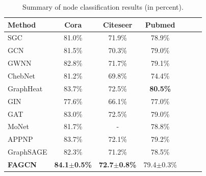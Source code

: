 \documentclass[letterpaper]{article} %
\begin{document}
\newsavebox{\tablebox}
\begin{table}
  \centering
  \caption{Summary of node classification results (in percent).}
	\begin{lrbox}{\tablebox}
    \begin{tabular}{lcccccc}
    \toprule
    \textbf{Method} & \textbf{Cora} & \textbf{Citeseer} & \textbf{Pubmed} \\
    \midrule
	SGC & 81.0\% & 71.9\% & 78.9\% \\
    GCN & 81.5\% & 70.3\% & 79.0\% \\
    GWNN & 82.8\% & 71.7\% & 79.1\%\\
    ChebNet & 81.2\% & 69.8\% & 74.4\%\\
    GraphHeat & 83.7\% & 72.5\% & \textbf{80.5\%}\\
	\midrule
	GIN & 77.6\% & 66.1\% & 77.0\%\\
	GAT & 83.0\% & 72.5\% & 79.0\%\\
	MoNet & 81.7\% & -     & 78.8\%\\
	APPNP & 83.7\% & 72.1\% & 79.2\%\\
    GraphSAGE & 82.3\% & 71.2\% & 78.5\%\\
    \midrule
	\textbf{FAGCN} & \textbf{84.1$\pm$0.5\%} & \textbf{72.7$\pm$0.8\%} & 79.4$\pm$0.3\% \\
    \bottomrule
    \end{tabular}
    \end{lrbox}
    \scalebox{1}{\usebox{\tablebox}}
  \label{assortative}
\end{table}
\end{document}
